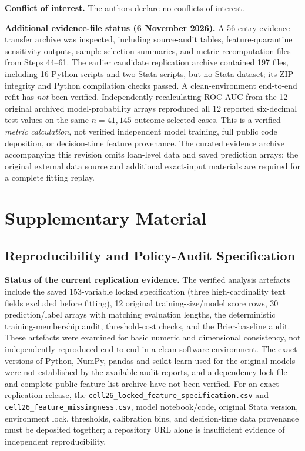 \documentclass[10pt]{article}
\begin{document}
 \noindent\textbf{Conflict of interest.} The authors declare no conflicts of interest.


\noindent\textbf{Additional evidence-file status (6 November 2026).} A 56-entry evidence transfer archive was inspected, including source-audit tables, feature-quarantine sensitivity outputs, sample-selection summaries, and metric-recomputation files from Steps 44--61. The earlier candidate replication archive contained 197 files, including 16 Python scripts and two Stata scripts, but no Stata dataset; its ZIP integrity and Python compilation checks passed. A clean-environment end-to-end refit has \emph{not} been verified. Independently recalculating ROC-AUC from the 12 original archived model-probability arrays reproduced all 12 reported six-decimal test values on the same $n=41{,}145$ outcome-selected cases. This is a verified \emph{metric calculation}, not verified independent model training, full public code deposition, or decision-time feature provenance. The curated evidence archive accompanying this revision omits loan-level data and saved prediction arrays; the original external data source and additional exact-input materials are required for a complete fitting replay.

\section{Supplementary Material}


\subsection{Reproducibility and Policy-Audit Specification}
\label{app:repro}

\noindent\textbf{Status of the current replication evidence.} The verified analysis artefacts include the saved 153-variable locked specification (three high-cardinality text fields excluded before fitting), 12 original training-size/model score rows, 30 prediction/label arrays with matching evaluation lengths, the deterministic training-membership audit, threshold-cost checks, and the Brier-baseline audit. These artefacts were examined for basic numeric and dimensional consistency, not independently reproduced end-to-end in a clean software environment. The exact versions of Python, NumPy, pandas and scikit-learn used for the original models were not established by the available audit reports, and a dependency lock file and complete public feature-list archive have not been verified. For an exact replication release, the \texttt{cell26\_locked\_feature\_specification.csv} and \texttt{cell26\_feature\_missingness.csv}, model notebook/code, original Stata version, environment lock, thresholds, calibration bins, and decision-time data provenance must be deposited together; a repository URL alone is insufficient evidence of independent reproducibility.
\end{document}
